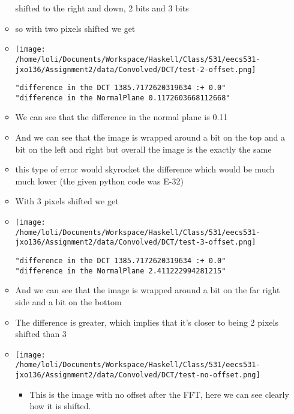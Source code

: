 \documentclass{article}
\begin{document}
\begin{itemize}
\begin{itemize}
shifted to the right and down, 2 bits and 3 bits
\item so with two pixels shifted we get
\item \texttt{[image: /home/loli/Documents/Workspace/Haskell/Class/531/eecs531-jxo136/Assignment2/data/Convolved/DCT/test-2-offset.png]}
\begin{verbatim}
"difference in the DCT 1385.7172620319634 :+ 0.0"
"difference in the NormalPlane 0.1172603668112668"
\end{verbatim}
\item We can see that the difference in the normal plane is 0.11
\item And we can see that the image is wrapped around a bit on the top and
a bit on the left and right but overall the image is the exactly the same
\item this type of error would skyrocket the difference which would be
much much lower (the given python code was E-32)
\item With 3 pixels shifted we get
\item \texttt{[image: /home/loli/Documents/Workspace/Haskell/Class/531/eecs531-jxo136/Assignment2/data/Convolved/DCT/test-3-offset.png]}
\begin{verbatim}
"difference in the DCT 1385.7172620319634 :+ 0.0"
"difference in the NormalPlane 2.411222994281215"
\end{verbatim}
\item And we can see that the image is wrapped around a bit on the far
right side and a bit on the bottom
\item The difference is greater, which implies that it's closer to being
2 pixels shifted than 3
\item \texttt{[image: /home/loli/Documents/Workspace/Haskell/Class/531/eecs531-jxo136/Assignment2/data/Convolved/DCT/test-no-offset.png]}
\begin{itemize}
\item This is the image with no offset after the FFT, here we can see
clearly how it is shifted.
\end{itemize}
\end{itemize}
\end{itemize}
\end{document}
